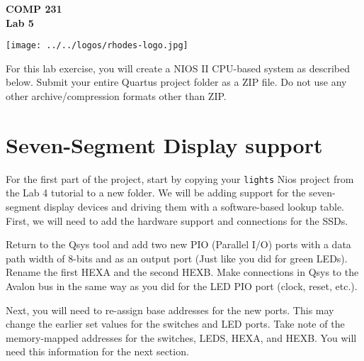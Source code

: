 \documentclass[10pt]{article}
\begin{document}
\hspace{-5mm}
\begin{minipage}{0.65\linewidth}
  \textbf{{\Large COMP 231\\Lab 5}}
\end{minipage}
\begin{minipage}{0.35\linewidth}
  \texttt{[image: ../../logos/rhodes-logo.jpg]}
\end{minipage}

\vspace{.4in}

\noindent For this lab exercise, you will create a NIOS II CPU-based
system as described below. Submit your entire Quartus project folder
as a ZIP file. Do not use any other archive/compression
formats other than ZIP. \\


\section{Seven-Segment Display support}

For the first part of the project, start by copying your {\tt lights} Nios
project from the Lab 4 tutorial to a new folder. We will be adding support for
the seven-segment display devices and driving them with a software-based
lookup table. First, we will need to add the hardware support and connections
for the SSDs.

Return to the Qsys tool and add two new PIO (Parallel I/O) ports with
a data path width of 8-bits and as an output port (Just like you did
for green LEDs). Rename the first HEXA and the second HEXB. Make
connections in Qsys to the Avalon bus in the same way as you did for
the LED PIO port (clock, reset, etc.).

Next, you will need to re-assign base addresses for the new
ports. This may change the earlier set values for the switches and LED
ports. Take note of the memory-mapped addresses for the switches,
LEDS, HEXA, and HEXB.  You will need this information for the next
section.
\end{document}

